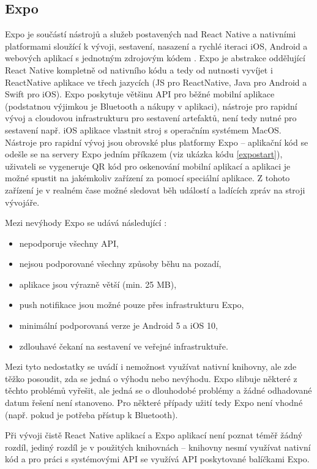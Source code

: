 \subsection{Expo}

Expo je součástí nástrojů a služeb postavených nad React Native a nativními platformami sloužící k vývoji, sestavení, nasazení a rychlé iteraci iOS, Android a webových aplikací s jednotným zdrojovým kódem \cite{Vatne2020}. Expo je abstrakce oddělující React Native kompletně od nativního kódu a tedy od nutnosti vyvíjet i ReactNative aplikace ve třech jazycích (JS pro ReactNative, Java pro Android a Swift pro iOS). Expo poskytuje většinu API pro běžné mobilní aplikace (podstatnou výjimkou je Bluetooth a nákupy v aplikaci), nástroje pro rapidní vývoj a cloudovou infrastrukturu pro sestavení artefaktů, není tedy nutné pro sestavení např. iOS aplikace vlastnit stroj s operačním systémem MacOS. Nástroje pro rapidní vývoj jsou obrovské plus platformy Expo -- aplikační kód se odešle se na servery Expo jedním příkazem (viz ukázka kódu \ref{expostart}), uživateli se vygeneruje QR kód pro oskenování mobilní aplikací a aplikaci je možné spustit na jakémkoliv zařízení za pomocí speciální aplikace. Z tohoto zařízení je v realném čase možné sledovat běh událostí a ladících zpráv na stroji vývojáře. 

Mezi nevýhody Expo se udává následující \cite{Ovchinnikova2020}:

\begin{itemize}
	\item nepodporuje všechny API,
	\item nejsou podporované všechny způsoby běhu na pozadí,
	\item aplikace jsou výrazně větší (min. 25 MB),
	\item push notifikace jsou možné pouze přes infrastrukturu Expo,
	\item minimální podporovaná verze je Android 5 a iOS 10,
	\item zdlouhavé čekaní na sestavení ve veřejné infrastruktuře.
\end{itemize}

Mezi tyto nedostatky se uvádí i nemožnost využívat nativní knihovny, ale zde těžko posoudit, zda se jedná o výhodu nebo nevýhodu. Expo slibuje některé z těchto problémů vyřešit, ale jedná se o dlouhodobé problémy a žádné odhadované datum řešení není stanoveno. Pro některé případy užití tedy Expo není vhodné (např. pokud je potřeba přístup k Bluetooth).

Při vývoji čistě React Native aplikací a Expo aplikací není poznat téměř žádný rozdíl, jediný rozdíl je v použitých knihovnách -- knihovny nesmí využívat nativní kód a pro práci s systémovými API se využívá API poskytované balíčkami Expo.

